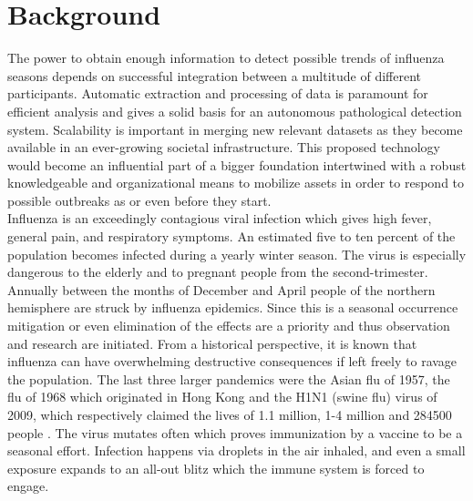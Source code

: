 \section{Background}
The power to obtain enough information to detect possible trends of influenza seasons depends on successful integration between a multitude of different participants. Automatic extraction and processing of data is paramount for efficient analysis and gives a solid basis for an autonomous pathological detection system. Scalability is important in merging new relevant datasets as they become available in an ever-growing societal infrastructure. This proposed technology would become an influential part of a bigger foundation intertwined with a robust knowledgeable and organizational means to mobilize assets in order to respond to possible outbreaks as or even before they start.
\newline \\
Influenza is an exceedingly contagious viral infection which gives high fever, general pain, and respiratory symptoms\cite{fhi_sykdommer}. An estimated five to ten percent of the population becomes infected during a yearly winter season. The virus is especially dangerous to the elderly and to pregnant people from the second-trimester. Annually between the months of December and April people of the northern hemisphere are struck by influenza epidemics. Since this is a seasonal occurrence mitigation or even elimination of the effects are a priority and thus observation and research are initiated. From a historical perspective, it is known that influenza can have overwhelming destructive consequences if left freely to ravage the population. The last three larger pandemics were the Asian flu of 1957, the flu of 1968 which originated in Hong Kong and the H1N1 (swine flu) virus of 2009, which respectively claimed the lives of 1.1 million, 1-4 million and 284500 people \cite{potter2001history}. The virus mutates often which proves immunization by a vaccine to be a seasonal effort. Infection happens via droplets in the air inhaled, and even a small exposure expands to an all-out blitz which the immune system is forced to engage.

